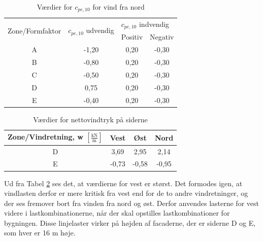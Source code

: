\begin{table}[htb]
	\begin{center}
		\begin{tabular}{ c c c c } 
			\hline
			\multirow{2}{*}{Zone/Formfaktor} & \multirow{2}{*}{$c_{pe,10}$ udvendig} & \multicolumn{2}{l}{$c_{pe,10}$ indvendig} \\ 
			& & Positiv & Negativ   		\\ \hline
			A & -1,20 & 0,20 & -0,30 \\	
			B & -0,80 & 0,20 & -0,30 \\	
			C & -0,50 & 0,20 & -0,30 \\	 
			D & 0,75 & 0,20 & -0,30 \\	
			E & -0,40 & 0,20 & -0,30 \\	
		\end{tabular}
		\caption{Værdier for $c_{pe,10}$ for vind fra nord}
		\label{tab:gg}
	\end{center}
\end{table}

\begin{table}[htb]
	\begin{center}
		\begin{tabular}{c c c c}
			\hline
			Zone/Vindretning, w $[\frac{\text{kN}}{\text{m}}]$ & Vest & Øst & Nord \\ \hline
			D & 3,69 & 2,95 & 2,14 \\ 
			E & -0,73 & -0,58 & -0,95 \\ 
		\end{tabular}
		\caption{Værdier for nettovindtryk på siderne}
		\label{tab:hh}
	\end{center}
\end{table}

Ud fra Tabel \ref{tab:hh} ses det, at værdierne for vest er størst. Det formodes igen, at vindlasten derfor er mere kritisk fra vest end for de to andre vindretninger, og der ses fremover bort fra vinden fra nord og øst. Derfor anvendes lasterne for vest videre i lastkombinationerne, når der skal opstilles lastkombinationer for bygningen.
\newline \indent{     }  Disse linjelaster virker på højden af facaderne, der er siderne D og E, som hver er 16 m høje.


